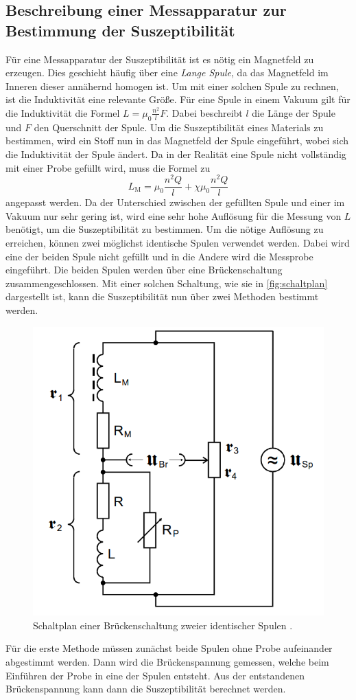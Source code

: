 \subsection{Beschreibung einer Messapparatur zur Bestimmung der Suszeptibilität}
\label{subsec:Messapparatur}
Für eine Messapparatur der Suszeptibilität ist es nötig ein Magnetfeld zu erzeugen. Dies geschieht häufig über eine \textit{Lange Spule}, da das Magnetfeld im Inneren dieser
annähernd homogen ist. Um mit einer solchen Spule zu rechnen, ist die Induktivität eine relevante Größe.
Für eine Spule in einem Vakuum gilt für die Induktivität die Formel $L = \mu_0 \frac{n^2}{l}F$. Dabei beschreibt $l$ die Länge der Spule und $F$ den Querschnitt der Spule.
Um die Suszeptibilität eines Materials zu bestimmen, wird ein Stoff nun in das Magnetfeld der Spule eingeführt, wobei sich die Induktivität der Spule ändert. 
Da in der Realität eine Spule nicht vollständig mit einer Probe gefüllt wird, muss die Formel zu 
\begin{equation}
    \label{eqn:L_M}
    L_{\text{M}} = \mu_0 \frac{n^2 Q}{l} + \chi \mu_0 \frac{n^2 Q}{l}
\end{equation} 
angepasst werden.
Da der Unterschied zwischen der gefüllten Spule und einer im Vakuum nur sehr gering ist, wird eine sehr hohe Auflösung für die Messung von $L$ benötigt,
um die Suszeptibilität zu bestimmen. Um die nötige Auflösung zu erreichen, können zwei möglichst identische Spulen verwendet werden. Dabei wird eine der beiden Spule nicht 
gefüllt und in die Andere wird die Messprobe eingeführt. Die beiden Spulen werden über eine Brückenschaltung zusammengeschlossen. Mit einer solchen Schaltung, wie sie in
\autoref{fig:schaltplan} dargestellt ist, kann die Suszeptibilität nun über zwei Methoden bestimmt werden.
\begin{figure}
    \centering
    \includegraphics[width = .5\textwidth]{content/Schaltung1.PNG}
    \caption{Schaltplan einer Brückenschaltung zweier identischer Spulen \cite{v606}.}
    \label{fig:schaltplan}
\end{figure} 
Für die erste Methode müssen zunächst beide Spulen ohne Probe aufeinander abgestimmt werden. Dann wird die Brückenspannung gemessen, welche beim Einführen der Probe in eine der 
Spulen entsteht. Aus der entstandenen Brückenspannung kann dann die Suszeptibilität berechnet werden.

